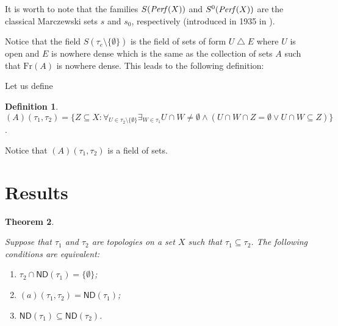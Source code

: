 \documentclass[12pt]{amsart}
\theoremstyle{plain}
\newtheorem{theorem}{Theorem}[section]
\theoremstyle{definition}
\newtheorem{definition}[theorem]{Definition}
\newtheorem{example}[theorem]{Example}
\theoremstyle{remark}
\newcommand{\Baire}{\mathfrak{Baire}}
\newcommand{\meager}{{\mathcal{MGR}}}
\newcommand{\Perf}{{\it Perf}}
\newcommand{\real}{\mathbb{R}}
\newcommand{\cK}{{\mathcal K}}
\newcommand{\cM}{{\mathcal M}}
\newcommand{\mathint}{\mathit{int}}
\newcommand{\aideal}{\mathit{(a)}}
\newcommand{\Afield}{\mathit{(A)}}
\begin{document}
It is worth to note that the families $S(\Perf(X))$
and $S^0(\Perf(X))$ are the classical Marczewski sets
$s$ and $s_0$, respectively (introduced in 1935 in \cite{SM}).


Notice that the field $S(\tau_e\setminus \lbrace \emptyset \rbrace)$
is the field of sets of form $U \bigtriangleup E$
where $U$ is open and $E$ is nowhere dense
which is the same as the collection of sets $A$ such that
$\mathrm{Fr}(A)$ is nowhere dense.
This leads to the following definition:

Let us define 
\begin{definition}
$\Afield(\tau_1, \tau_2) = \{ Z \subseteq X \colon
\forall_{U \in \tau_2 \setminus \{ \emptyset\}}
\exists_{W \in \tau_1} U \cap W \not= \emptyset \wedge
(U \cap W \cap Z = \emptyset \vee U \cap W \subseteq Z)\}$.
\end{definition}

Notice that $\Afield(\tau_1, \tau_2)$ is a field of sets.

\section{Results}

\begin{theorem}
\label{theorem:collapse-theorem}

Suppose that $\tau_1$ and $\tau_2$ are topologies on a set $X$ such
that $\tau_1 \subseteq \tau_2$.
The following conditions are equivalent:
\begin{enumerate}
\item $\tau_2 \cap \mathsf{ND}(\tau_1) = \lbrace \emptyset \rbrace$;
\item $\aideal(\tau_1, \tau_2) = \mathsf{ND}(\tau_1)$;
\item $\mathsf{ND}(\tau_1) \subseteq \mathsf{ND}(\tau_2)$.
\end{enumerate}
\end{theorem}
									
\end{document}
